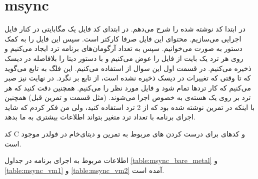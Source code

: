 \section{msync}
در ابتدا کد نوشته شده را شرح می‌دهم. در ابتدای کد فایل یک مگابایتی در کنار فایل اجرایی می‌سازیم.
محتوای این فایل صرفا کارکتر
است. سپس این فایل را به کمک دستور
به صورت
می‌خوانیم. سپس به تعداد آرگومان‌های برنامه ترد ایجاد می‌کنیم و روی هر ترد یک بایت از فایل را عوض
می‌کنیم و با دستور
دیتا را بلافاصله در دیسک ذخیره می‌کنیم. در قسمت اول این سوال از
استفاده می‌کنیم. این فلگ به تابع
می‌گوید که تا وقتی که تغییرات در دیسک ذخیره نشده است، از تابع بر نگرد.
در نهایت نیز صبر می‌کنیم که کار ترد‌ها تمام شود و فایل مورد نظر را
می‌کنیم. همچنین دقت کنید که هر ترد بر روی یک هسته‌ی به خصوص اجرا می‌شوند.
(مثل قسمت و تمرین قبل)
همچنین با اینکه در تمرین نوشته شده بود که از 2 ترد استفاده کنید، ولی من فکر کردم که شاید اجرای
برنامه با تعداد ترد متغیر بتواند اطلاعات بیشتری به ما بدهد.

کد
C
و کد‌های
برای درست کردن
های
مربوط به تمرین و دیتای‌خام در فولدر
موجود است.

اطلاعات مربوط به اجرای برنامه در جداول
\ref{table:msync_bare_metal} و \ref{table:msync_vm1} و \ref{table:msync_vm2}
آمده است.

